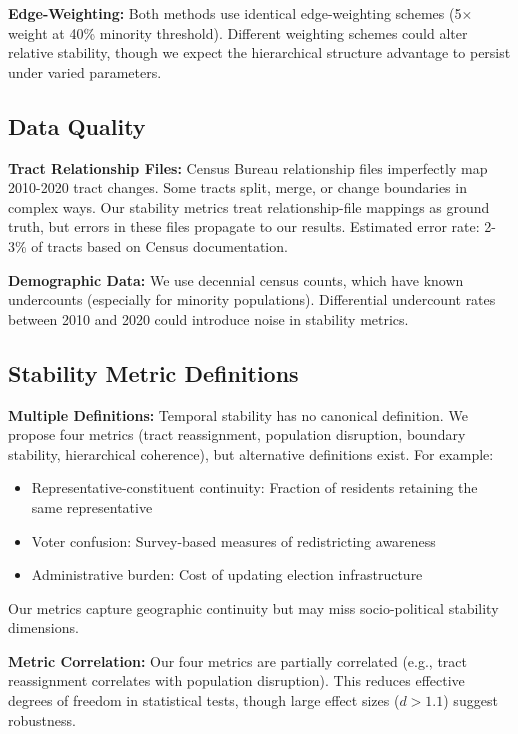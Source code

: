 \textbf{Edge-Weighting:} Both methods use identical edge-weighting schemes (5$\times$ weight at 40\% minority threshold). Different weighting schemes could alter relative stability, though we expect the hierarchical structure advantage to persist under varied parameters.

\subsection{Data Quality}

\textbf{Tract Relationship Files:} Census Bureau relationship files imperfectly map 2010-2020 tract changes. Some tracts split, merge, or change boundaries in complex ways. Our stability metrics treat relationship-file mappings as ground truth, but errors in these files propagate to our results. Estimated error rate: 2-3\% of tracts based on Census documentation.

\textbf{Demographic Data:} We use decennial census counts, which have known undercounts (especially for minority populations). Differential undercount rates between 2010 and 2020 could introduce noise in stability metrics.

\subsection{Stability Metric Definitions}

\textbf{Multiple Definitions:} Temporal stability has no canonical definition. We propose four metrics (tract reassignment, population disruption, boundary stability, hierarchical coherence), but alternative definitions exist. For example:
\begin{itemize}
    \item Representative-constituent continuity: Fraction of residents retaining the same representative
    \item Voter confusion: Survey-based measures of redistricting awareness
    \item Administrative burden: Cost of updating election infrastructure
\end{itemize}

Our metrics capture geographic continuity but may miss socio-political stability dimensions.

\textbf{Metric Correlation:} Our four metrics are partially correlated (e.g., tract reassignment correlates with population disruption). This reduces effective degrees of freedom in statistical tests, though large effect sizes ($d>1.1$) suggest robustness.

